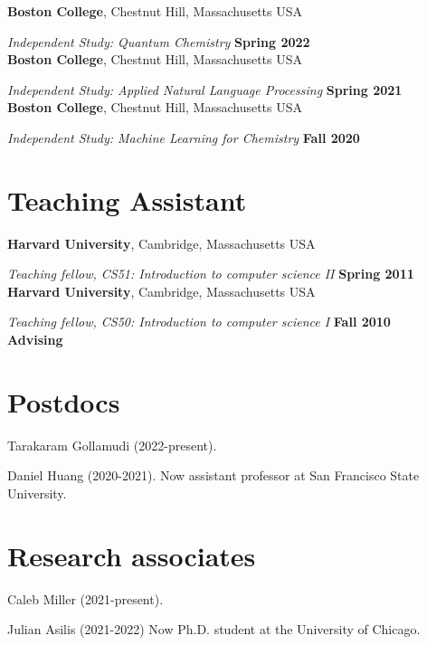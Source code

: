 \documentclass[margin,line]{res}
\begin{document}
\begin{resume}
{\bf Boston College}, Chestnut Hill, Massachusetts USA
\vspace{-.4cm}

{\em Independent Study: Quantum Chemistry} \hfill {\bf Spring 2022}\\
{\bf Boston College}, Chestnut Hill, Massachusetts USA
\vspace{-.4cm}

{\em Independent Study: Applied Natural Language Processing} \hfill {\bf Spring 2021}\\
{\bf Boston College}, Chestnut Hill, Massachusetts USA
\vspace{-.4cm}

{\em Independent Study: Machine Learning for Chemistry} \hfill {\bf Fall 2020}\\

\section{\sc Teaching Assistant}

{\bf Harvard University}, Cambridge, Massachusetts USA
\vspace{-.4cm}

{\em Teaching fellow, CS51: Introduction to computer science II} \hfill {\bf Spring 2011}\\
{\bf Harvard University}, Cambridge, Massachusetts USA

\vspace{-.4cm}
{\em Teaching fellow, CS50: Introduction to computer science I} \hfill {\bf Fall 2010}\\


\newpage
  {\bf {\Large Advising}}

\section{\sc Postdocs}

Tarakaram Gollamudi (2022-present).

Daniel Huang (2020-2021). \hfill Now assistant professor at San Francisco State University.

\section{\sc Research associates}

Caleb Miller (2021-present).

Julian Asilis (2021-2022) \hfill Now Ph.D. student at the University of Chicago.


\end{resume}
\end{document}
